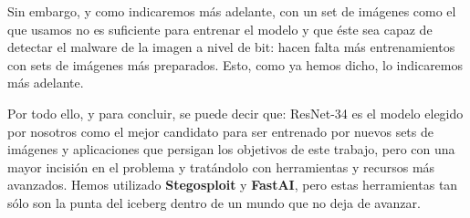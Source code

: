 Sin embargo, y como indicaremos más adelante, con un set de imágenes como el que usamos no es suficiente para entrenar el modelo y que éste sea capaz de detectar el malware de la imagen a nivel de bit: hacen falta más entrenamientos con sets de imágenes más preparados. Esto, como ya hemos dicho, lo indicaremos más adelante.

Por todo ello, y para concluir, se puede decir que: ResNet-34 es el modelo elegido por nosotros como el mejor candidato para ser entrenado por nuevos sets de imágenes y aplicaciones que persigan los objetivos de este trabajo, pero con una mayor incisión en el problema y tratándolo con herramientas y recursos más avanzados. Hemos utilizado \textbf{Stegosploit} y \textbf{FastAI}, pero estas herramientas tan sólo son la punta del iceberg dentro de un mundo que no deja de avanzar.
